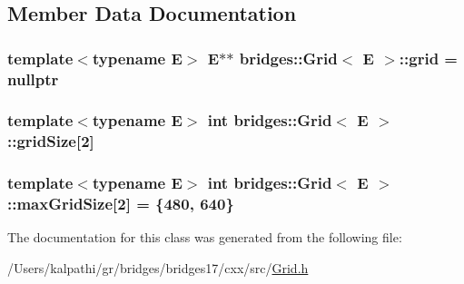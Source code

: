 \subsection{Member Data Documentation}
\hypertarget{classbridges_1_1_grid_aea6c38498d477f09dc03906ee6fb6e19}{}
\subsubsection[{grid}]{\setlength{\rightskip}{0pt plus 5cm}template$<$typename E$>$ E$\ast$$\ast$ {\bf bridges\+::\+Grid}$<$ E $>$\+::grid = nullptr\hspace{0.3cm}{\ttfamily [protected]}}\label{classbridges_1_1_grid_aea6c38498d477f09dc03906ee6fb6e19}
\hypertarget{classbridges_1_1_grid_af7c3a077b54e3346621e54276c1fa13e}{}
\subsubsection[{grid\+Size}]{\setlength{\rightskip}{0pt plus 5cm}template$<$typename E$>$ int {\bf bridges\+::\+Grid}$<$ E $>$\+::grid\+Size\mbox{[}2\mbox{]}\hspace{0.3cm}{\ttfamily [protected]}}\label{classbridges_1_1_grid_af7c3a077b54e3346621e54276c1fa13e}
\hypertarget{classbridges_1_1_grid_a800909a94e0affac82da79cf3e6d03e5}{}
\subsubsection[{max\+Grid\+Size}]{\setlength{\rightskip}{0pt plus 5cm}template$<$typename E$>$ int {\bf bridges\+::\+Grid}$<$ E $>$\+::max\+Grid\+Size\mbox{[}2\mbox{]} = \{480, 640\}\hspace{0.3cm}{\ttfamily [protected]}}\label{classbridges_1_1_grid_a800909a94e0affac82da79cf3e6d03e5}


The documentation for this class was generated from the following file\+:\begin{DoxyCompactItemize}
\item 
/\+Users/kalpathi/gr/bridges/bridges17/cxx/src/\hyperlink{_grid_8h}{Grid.\+h}\end{DoxyCompactItemize}
